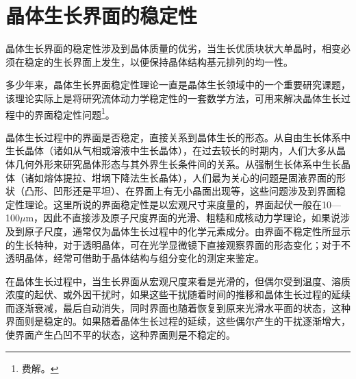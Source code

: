 \section{晶体生长界面的稳定性}
晶体生长界面的稳定性涉及到晶体质量的优劣，当生长优质块状大单晶时，相变必须在稳定的生长界面上发生，以便保持晶体结构基元排列的均一性。

多少年来，晶体生长界面稳定性理论一直是晶体生长领域中的一个重要研究课题，该理论实际上是将研究流体动力学稳定性的一套数学方法，可用来解决晶体生长过程中的界面稳定性问题\footnote{费解。}。

晶体生长过程中的界面是否稳定，直接关系到晶体生长的形态。从自由生长体系中生长晶体（诸如从气相或溶液中生长晶体），在过去较长的时期内，人们大多从晶体几何外形来研究晶体形态与其外界生长条件间的关系。从强制生长体系中生长晶体（诸如熔体提拉、坩埚下降法生长晶体），人们最为关心的问题是固液界面的形状（凸形、凹形还是平坦）、在界面上有无小晶面出现等，这些问题涉及到界面稳定性理论。这里所说的界面稳定性是以宏观尺寸来度量的，界面起伏一般在10---100$\mu$m，因此不直接涉及原子尺度界面的光滑、粗糙和成核动力学理论，如果说涉及到原子尺度，通常仅为晶体生长过程中的化学元素成分。由界面不稳定性所显示的生长特种，对于透明晶体，可在光学显微镜下直接观察界面的形态变化；对于不透明晶体，经常可借助于晶体结构与组分变化的测定来鉴定。

在晶体生长过程中，当生长界面从宏观尺度来看是光滑的，但偶尔受到温度、溶质浓度的起伏、或外因干扰时，如果这些干扰随着时间的推移和晶体生长过程的延续而逐渐衰减，最后自动消失，同时界面也随着恢复到原来光滑水平面的状态，这种界面则是稳定的。如果随着晶体生长过程的延续，这些偶尔产生的干扰逐渐增大，使界面产生凸凹不平的状态，这种界面则是不稳定的。

